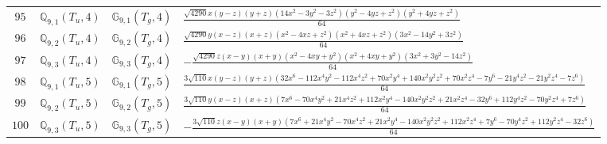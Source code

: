 \documentclass[fleqn,8pt,landscape]{jsarticle}
\begin{document}
\begin{table}[ht!]
\begin{center}
\begin{tabular}{cccl}
$ 95 $ & $ \mathbb{Q}_{9,1}(T_{u},4) $ & $ \mathbb{G}_{9,1}(T_{g},4) $ & $ \frac{\sqrt{4290} x \left(y - z\right) \left(y + z\right) \left(14 x^{2} - 3 y^{2} - 3 z^{2}\right) \left(y^{2} - 4 y z + z^{2}\right) \left(y^{2} + 4 y z + z^{2}\right)}{64} $ \\
$ 96 $ & $ \mathbb{Q}_{9,2}(T_{u},4) $ & $ \mathbb{G}_{9,2}(T_{g},4) $ & $ \frac{\sqrt{4290} y \left(x - z\right) \left(x + z\right) \left(x^{2} - 4 x z + z^{2}\right) \left(x^{2} + 4 x z + z^{2}\right) \left(3 x^{2} - 14 y^{2} + 3 z^{2}\right)}{64} $ \\
$ 97 $ & $ \mathbb{Q}_{9,3}(T_{u},4) $ & $ \mathbb{G}_{9,3}(T_{g},4) $ & $ - \frac{\sqrt{4290} z \left(x - y\right) \left(x + y\right) \left(x^{2} - 4 x y + y^{2}\right) \left(x^{2} + 4 x y + y^{2}\right) \left(3 x^{2} + 3 y^{2} - 14 z^{2}\right)}{64} $ \\
$ 98 $ & $ \mathbb{Q}_{9,1}(T_{u},5) $ & $ \mathbb{G}_{9,1}(T_{g},5) $ & $ \frac{3 \sqrt{110} x \left(y - z\right) \left(y + z\right) \left(32 x^{6} - 112 x^{4} y^{2} - 112 x^{4} z^{2} + 70 x^{2} y^{4} + 140 x^{2} y^{2} z^{2} + 70 x^{2} z^{4} - 7 y^{6} - 21 y^{4} z^{2} - 21 y^{2} z^{4} - 7 z^{6}\right)}{64} $ \\
$ 99 $ & $ \mathbb{Q}_{9,2}(T_{u},5) $ & $ \mathbb{G}_{9,2}(T_{g},5) $ & $ \frac{3 \sqrt{110} y \left(x - z\right) \left(x + z\right) \left(7 x^{6} - 70 x^{4} y^{2} + 21 x^{4} z^{2} + 112 x^{2} y^{4} - 140 x^{2} y^{2} z^{2} + 21 x^{2} z^{4} - 32 y^{6} + 112 y^{4} z^{2} - 70 y^{2} z^{4} + 7 z^{6}\right)}{64} $ \\
$ 100 $ & $ \mathbb{Q}_{9,3}(T_{u},5) $ & $ \mathbb{G}_{9,3}(T_{g},5) $ & $ - \frac{3 \sqrt{110} z \left(x - y\right) \left(x + y\right) \left(7 x^{6} + 21 x^{4} y^{2} - 70 x^{4} z^{2} + 21 x^{2} y^{4} - 140 x^{2} y^{2} z^{2} + 112 x^{2} z^{4} + 7 y^{6} - 70 y^{4} z^{2} + 112 y^{2} z^{4} - 32 z^{6}\right)}{64} $ \\
 \hline \hline
\end{tabular}
\end{center}
\end{table}
\end{document}
